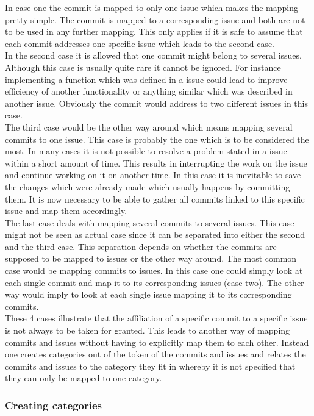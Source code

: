 In case one the commit is mapped to only one issue which makes the mapping pretty simple.
The commit is mapped to a corresponding issue and both are not to be used in any further mapping.
This only applies if it is safe to assume that each commit addresses one specific issue which leads to the second case.\\
In the second case it is allowed that one commit might belong to several issues.
Although this case is usually quite rare it cannot be ignored.
For instance implementing a function which was defined in a issue could lead to improve efficiency of another functionality or anything similar which was described in another issue.
Obviously the commit would address to two different issues in this case.\\
The third case would be the other way around which means mapping several commits to one issue.
This case is probably the one which is to be considered the most.
In many cases it is not possible to resolve a problem stated in a issue within a short amount of time.
This results in interrupting the work on the issue and continue working on it on another time.
In this case it is inevitable to save the changes which were already made which usually happens by committing them.
It is now necessary to be able to gather all commits linked to this specific issue and map them accordingly.\\
The last case deals with mapping several commits to several issues.
This case might not be seen as actual case since it can be separated into either the second and the third case.
This separation depends on whether the commits are supposed to be mapped to issues or the other way around.
The most common case would be mapping commits to issues.
In this case one could simply look at each single commit and map it to its corresponding issues (case two).
The other way would imply to look at each single issue mapping it to its corresponding commits.\\
These 4 cases illustrate that the affiliation of a specific commit to a specific issue is not always to be taken for granted.
This leads to another way of mapping commits and issues without having to explicitly map them to each other.
Instead one creates categories out of the token of the commits and issues and relates the commits and issues to the category they fit in whereby it is not specified that they can only be mapped to one category.

\subsubsection{Creating categories}

